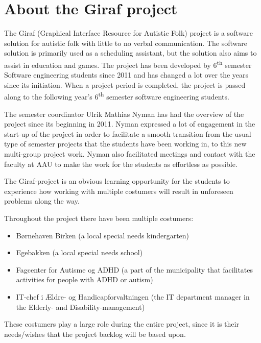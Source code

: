 \section{About the Giraf project}
The Giraf (Graphical Interface Resource for Autistic Folk) project is a software solution for autistic folk with little to no verbal communication.
The software solution is primarily used as a scheduling assistant, but the solution also aims to assist in education and games.
The project has been developed by 6\textsuperscript{th} semester Software engineering students since 2011 and has changed a lot over the years since its initiation.
When a project period is completed, the project is passed along to the following year's 6\textsuperscript{th} semester software engineering students.

The semester coordinator Ulrik Mathias Nyman has had the overview of the project since its beginning in 2011.
Nyman expressed a lot of engagement in the start-up of the project in order to facilitate a smooth transition from the usual type of semester projects that the students have been working in, to this new multi-group project work.
Nyman also facilitated meetings and contact with the faculty at AAU to make the work for the students as effortless as possible.

The Giraf-project is an obvious learning opportunity for the students to experience how working with multiple costumers will result in unforeseen problems along the way.

Throughout the project there have been multiple costumers:

\begin{itemize}
	\item Børnehaven Birken (a local special needs kindergarten)
	\item Egebakken (a local special needs school)
	\item Fagcenter for Autisme og ADHD (a part of the municipality that facilitates activities for people with ADHD or autism)
	\item IT-chef i Ældre- og Handicapforvaltningen (the IT department manager in the Elderly- and Disability-management)
\end{itemize}

These costumers play a large role during the entire project, since it is their needs/wishes that the project backlog will be based upon.
